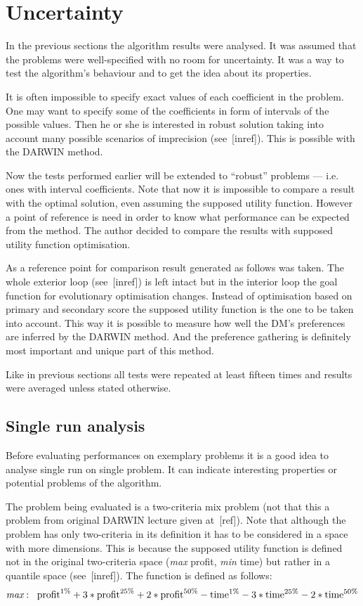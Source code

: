 \section{Uncertainty}
In the previous sections the algorithm results were analysed. It was assumed
that the problems were well-specified with no room for uncertainty. It was a
way to test the algorithm's behaviour and to get the idea about its
properties.

It is often impossible to specify exact values of each coefficient in the
problem. One may want to specify some of the coefficients in form of intervals
of the possible values. Then he or she is interested in robust solution taking
into account many possible scenarios of imprecision (see~[inref]). This is
possible with the DARWIN method.

Now the tests performed earlier will be extended to ``robust'' problems ---
i.e. ones with interval coefficients. Note that now it is impossible to
compare a result with the optimal solution, even assuming the supposed utility
function. However a point of reference is need in order to know what
performance can be expected from the method. The author decided to compare the
results with supposed utility function optimisation.

As a reference point for comparison result generated as follows was taken. The
whole exterior loop (see~[inref]) is left intact but in the interior loop the
goal function for evolutionary optimisation changes. Instead of optimisation
based on primary and secondary score the supposed utility function is the one
to be taken into account. This way it is possible to measure how well the DM's
preferences are inferred by the DARWIN method. And the preference gathering is
definitely most important and unique part of this method.

Like in previous sections all tests were repeated at least fifteen times and
results were averaged unless stated otherwise.

\subsection{Single run analysis}
Before evaluating performances on exemplary problems it is a good idea to
analyse single run on single problem. It can indicate interesting properties
or potential problems of the algorithm.

The problem being evaluated is a two-criteria mix problem (not that this a
problem from original DARWIN lecture given at~[ref]). Note that although the
problem has only two-criteria in its definition it has to be considered in a
space with more dimensions. This is because the supposed utility function is
defined not in the original two-criteria space (\textit{max} profit,
\textit{min} time) but rather in a quantile space (see~[inref]). The function
is defined as follows:
\begin{equation*}
\textit{max}: \hspace{0.2cm} \text{profit}^{1\%} + 3 * \text{profit}^{25\%} +
2 * \text{profit}^{50\%} - \text{time}^{1\%} - 3 * \text{time}^{25\%} - 2 *
\text{time}^{50\%}
\end{equation*}

